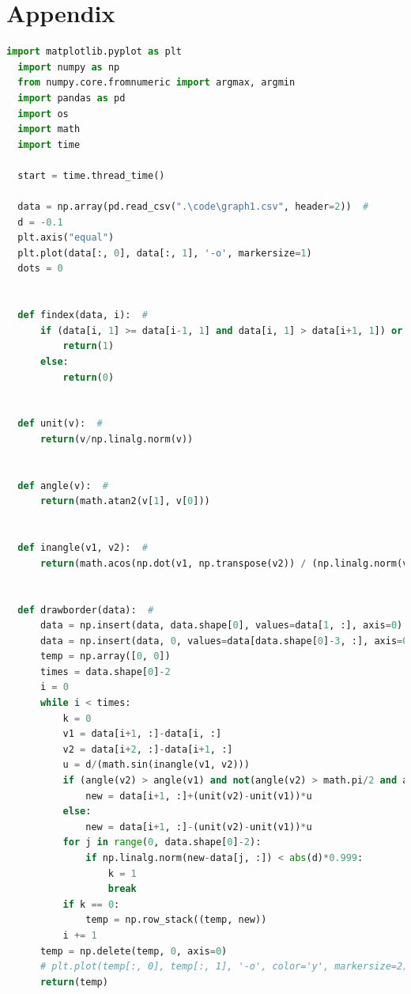 \documentclass{apmcmthesis}
\begin{document}
\section{Appendix}
\begin{lstlisting}[language=Python,caption={The python Source code of contour parallel hatch}]
  import matplotlib.pyplot as plt 
  import numpy as np
  from numpy.core.fromnumeric import argmax, argmin
  import pandas as pd
  import os
  import math
  import time
  
  start = time.thread_time()
  
  data = np.array(pd.read_csv(".\code\graph1.csv", header=2))  # 
  d = -0.1
  plt.axis("equal")
  plt.plot(data[:, 0], data[:, 1], '-o', markersize=1)
  dots = 0
  
  
  def findex(data, i):  # 
      if (data[i, 1] >= data[i-1, 1] and data[i, 1] > data[i+1, 1]) or (data[i, 1] <= data[i-1, 1] and data[i, 1] < data[i+1, 1]):
          return(1)
      else:
          return(0)
  
  
  def unit(v):  # 
      return(v/np.linalg.norm(v))
  
  
  def angle(v):  # 
      return(math.atan2(v[1], v[0]))
  
  
  def inangle(v1, v2):  # 
      return(math.acos(np.dot(v1, np.transpose(v2)) / (np.linalg.norm(v1)*np.linalg.norm(v2))))
  
  
  def drawborder(data):  # 
      data = np.insert(data, data.shape[0], values=data[1, :], axis=0)
      data = np.insert(data, 0, values=data[data.shape[0]-3, :], axis=0)
      temp = np.array([0, 0])
      times = data.shape[0]-2
      i = 0
      while i < times:
          k = 0
          v1 = data[i+1, :]-data[i, :]
          v2 = data[i+2, :]-data[i+1, :]
          u = d/(math.sin(inangle(v1, v2)))
          if (angle(v2) > angle(v1) and not(angle(v2) > math.pi/2 and angle(v1) < -math.pi/2)) or (angle(v2) < -math.pi/2 and angle(v1) > math.pi/2):
              new = data[i+1, :]+(unit(v2)-unit(v1))*u
          else:
              new = data[i+1, :]-(unit(v2)-unit(v1))*u
          for j in range(0, data.shape[0]-2):
              if np.linalg.norm(new-data[j, :]) < abs(d)*0.999:
                  k = 1
                  break
          if k == 0:
              temp = np.row_stack((temp, new))
          i += 1
      temp = np.delete(temp, 0, axis=0)
      # plt.plot(temp[:, 0], temp[:, 1], '-o', color='y', markersize=2)
      return(temp)
  

\end{lstlisting}
\end{document}
